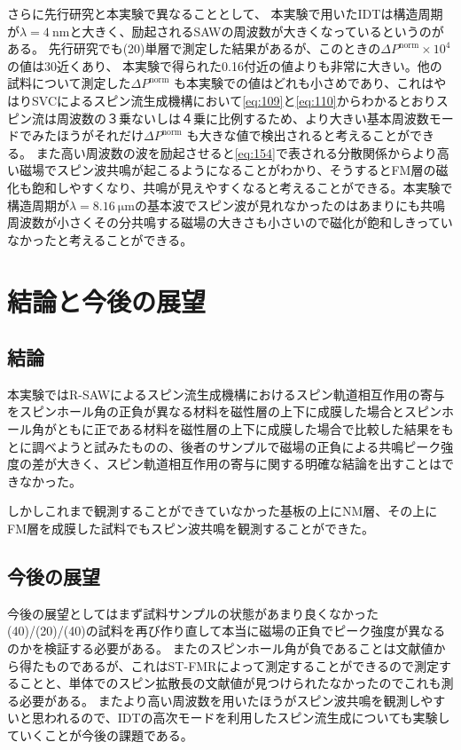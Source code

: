 \documentclass[dvipdfmx,11pt]{jsreport}
\numberwithin{equation}{chapter}
\numberwithin{table}{chapter}
\begin{document}
さらに先行研究と本実験で異なることとして、
本実験で用いたIDTは構造周期が$\lambda=\SI{4}{\nano \metre}$と大きく、励起されるSAWの周波数が大きくなっているというのがある。
先行研究でも(20)単層で測定した結果があるが、このときの$\Delta P^{\text{norm}}\times 10^{4}$の値は30近くあり\cite{ku}、
本実験で得られた0.16付近の値よりも非常に大きい。他の試料について測定した$\Delta P^{\text{norm}}$ も本実験での値はどれも小さめであり、これはやはりSVCによるスピン流生成機構において\eqref{eq:109}と\eqref{eq:110}からわかるとおりスピン流は周波数の３乗ないしは４乗に比例するため、より大きい基本周波数モードでみたほうがそれだけ$\Delta P^{\text{norm}}$ も大きな値で検出されると考えることができる。
また高い周波数の波を励起させると\eqref{eq:154}で表される分散関係からより高い磁場でスピン波共鳴が起こるようになることがわかり、そうするとFM層の磁化も飽和しやすくなり、共鳴が見えやすくなると考えることができる。本実験で構造周期が$\lambda=\SI{8,16}{\micro \metre}$の基本波でスピン波が見れなかったのはあまりにも共鳴周波数が小さくその分共鳴する磁場の大きさも小さいので磁化が飽和しきっていなかったと考えることができる。
\chapter{結論と今後の展望}
\section{結論}
本実験ではR-SAWによるスピン流生成機構におけるスピン軌道相互作用の寄与をスピンホール角の正負が異なる材料を磁性層の上下に成膜した場合とスピンホール角がともに正である材料を磁性層の上下に成膜した場合で比較した結果をもとに調べようと試みたものの、後者のサンプルで磁場の正負による共鳴ピーク強度の差が大きく、スピン軌道相互作用の寄与に関する明確な結論を出すことはできなかった。

しかしこれまで観測することができていなかった基板の上にNM層、その上にFM層を成膜した試料でもスピン波共鳴を観測することができた。
\section{今後の展望}
今後の展望としてはまず試料サンプルの状態があまり良くなかった(40)/(20)/(40)の試料を再び作り直して本当に磁場の正負でピーク強度が異なるのかを検証する必要がある。
またのスピンホール角が負であることは文献値から得たものであるが、これはST-FMRによって測定することができるので測定することと、単体でのスピン拡散長の文献値が見つけられたなかったのでこれも測る必要がある。
またより高い周波数を用いたほうがスピン波共鳴を観測しやすいと思われるので、IDTの高次モードを利用したスピン流生成についても実験していくことが今後の課題である。
\end{document}

